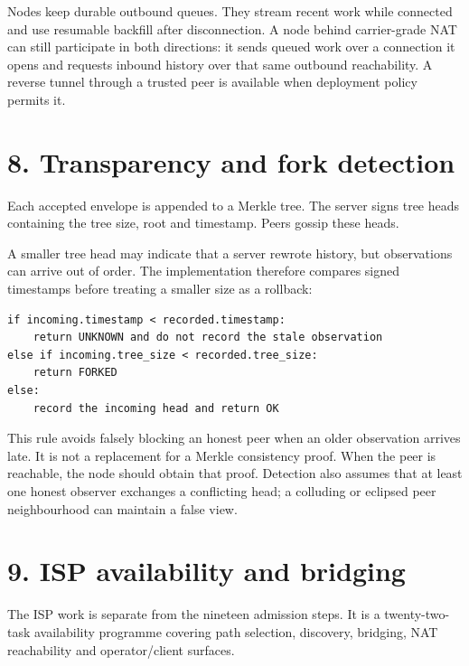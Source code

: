 \documentclass[12pt,a4paper]{article}
\begin{document}
Nodes keep durable outbound queues. They stream recent work while connected and use resumable backfill after disconnection. A node behind carrier-grade NAT can still participate in both directions: it sends queued work over a connection it opens and requests inbound history over that same outbound reachability. A reverse tunnel through a trusted peer is available when deployment policy permits it.

\section*{8. Transparency and fork detection}
Each accepted envelope is appended to a Merkle tree. The server signs tree heads containing the tree size, root and timestamp. Peers gossip these heads.

A smaller tree head may indicate that a server rewrote history, but observations can arrive out of order. The implementation therefore compares signed timestamps before treating a smaller size as a rollback:

\begin{lstlisting}
if incoming.timestamp < recorded.timestamp:
    return UNKNOWN and do not record the stale observation
else if incoming.tree_size < recorded.tree_size:
    return FORKED
else:
    record the incoming head and return OK
\end{lstlisting}
This rule avoids falsely blocking an honest peer when an older observation arrives late. It is not a replacement for a Merkle consistency proof. When the peer is reachable, the node should obtain that proof. Detection also assumes that at least one honest observer exchanges a conflicting head; a colluding or eclipsed peer neighbourhood can maintain a false view.

\section*{9. ISP availability and bridging}
The ISP work is separate from the nineteen admission steps. It is a twenty-two-task availability programme covering path selection, discovery, bridging, NAT reachability and operator/client surfaces.
\end{document}
